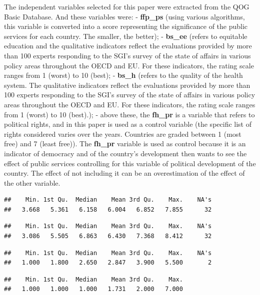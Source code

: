 \documentclass[]{elsarticle} %
\begin{document}
The independent variables selected for this paper were extracted from
the QOG Basic Database. And these variables were: - \textbf{ffp\_ps}
(using various algorithms, this variable is converted into a score
representing the significance of the public services for each country.
The smaller, the better); - \textbf{bs\_ee} (refers to equitable
education and the qualitative indicators reflect the evaluations
provided by more than 100 experts responding to the SGI's survey of the
state of affairs in various policy areas throughout the OECD and EU. For
these indicators, the rating scale ranges from 1 (worst) to 10 (best); -
\textbf{bs\_h} (refers to the quality of the health system. The
qualitative indicators reflect the evaluations provided by more than 100
experts responding to the SGI's survey of the state of affairs in
various policy areas throughout the OECD and EU. For these indicators,
the rating scale ranges from 1 (worst) to 10 (best).); - above these,
the \textbf{fh\_pr} is a variable that refers to political rights, and
in this paper is used as a control variable (the specific list of rights
considered varies over the years. Countries are graded between 1 (most
free) and 7 (least free)). The \textbf{fh\_pr} variable is used as
control because it is an indicator of democracy and of the country's
development then wants to see the effect of public services controlling
for this variable of political development of the country. The effect of
not including it can be an overestimation of the effect of the other
variable.

\begin{verbatim}
##    Min. 1st Qu.  Median    Mean 3rd Qu.    Max.    NA's 
##   3.668   5.361   6.158   6.004   6.852   7.855      32
\end{verbatim}

\begin{verbatim}
##    Min. 1st Qu.  Median    Mean 3rd Qu.    Max.    NA's 
##   3.086   5.505   6.863   6.430   7.368   8.412      32
\end{verbatim}

\begin{verbatim}
##    Min. 1st Qu.  Median    Mean 3rd Qu.    Max.    NA's 
##   1.000   1.800   2.650   2.847   3.900   5.500       2
\end{verbatim}

\begin{verbatim}
##    Min. 1st Qu.  Median    Mean 3rd Qu.    Max. 
##   1.000   1.000   1.000   1.731   2.000   7.000
\end{verbatim}
\end{document}
